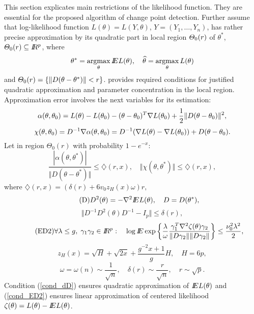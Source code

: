 This section explicates main restrictions of the likelihood function. They are essential for the proposed algorithm of change point detection. Further assume that log-likelihood function $L(\theta) = L(Y,\theta)$,  $Y = (Y_1,\ldots,Y_n)$, has rather precise approximation by its quadratic part in local region $\varTheta_0(r)$  of $\theta^*$, $\varTheta_0(r) \subseteq I\!\!R^p$, where
\[
\theta^* = \argmax_{\theta} \E L(\theta),
\quad
\widehat{\theta} = \argmax_{\theta} L(\theta)
\]
and $\varTheta_0(r) = \{\Vert D (\theta - \theta^*) \Vert < r \}$. \cite{wilks2013} provides required conditions for justified quadratic approximation and parameter concentration in the local region.
Approximation error involves the next variables for its estimation:
\[
  \alpha(\theta, \theta_0) = L(\theta) - L(\theta_0)   - (\theta - \theta_0)^T \nabla L( \theta_0) +  \frac{1}{2} \Vert D (\theta - \theta_0) \Vert^2, 
\]
\[
\chi(\theta, \theta_0) = D^{-1} \nabla \alpha(\theta, \theta_0) 
= D^{-1} (\nabla L(\theta) - \nabla L( \theta_0) ) +  D (\theta - \theta_0). 
\]
Let  in region $\Theta_0(r)$ with probability $1 - e^{-x}$:
\begin{equation}\label{cond_A}\tag{A}
\frac{| \alpha(\theta, \theta^*)  |}{\Vert D(\theta - \theta^*) \Vert} \leq \diamondsuit (r, x),  
\quad
  \Vert \chi(\theta, \theta^*) \Vert \leq  \diamondsuit (r, x),
\end{equation}
where $\diamondsuit (r, x) = (\delta (r) + 6 v_0 z_H(x) \omega ) r,$
\[\tag{D}
D^2(\theta) = - \nabla^2 I\!\!E L (\theta),
\quad
D = D(\theta^*),
\]
\begin{equation}\label{cond_dD}\tag{dD}
\Vert D^{-1} D^2(\theta) D^{-1} - I_p\Vert \leq \delta(r),
\end{equation}
\begin{equation}\label{cond_ED2}\tag{ED2}
\forall \lambda \leq g, \; \gamma_1 \gamma_2 \in I\!\!R^p: \quad
\log I\!\!E \exp \left\{
\frac{\lambda}{\omega} \frac{\gamma_1^T \nabla^2 \zeta(\theta) \gamma_2}{\Vert D \gamma_2 \Vert \Vert D \gamma_2 \Vert}
\right\} \leq 
\frac{\nu_0^2 \lambda^2}{2},
\end{equation}
\[
z_H(x) = \sqrt{H} + \sqrt{2x} + \frac{g^{-2} x + 1}{g} H, 
\quad H = 6p,
\]
\[
\omega = \omega(n) \sim \frac{1}{\sqrt{n}}, 
\quad
\delta(r) \sim \frac{r}{\sqrt{n}},
\quad
r \sim \sqrt{p}.
\]
Condition (\ref{cond_dD}) ensures quadratic approximation of $I\!\!E L(\theta)$ and (\ref{cond_ED2}) ensures linear approximation of centered likelihood $\zeta(\theta) = L(\theta) - I\!\!E L(\theta)$.  